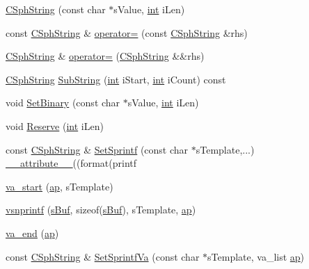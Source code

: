 \begin{DoxyCompactItemize}
\hyperlink{structCSphString_a346b8a5d60beab04f0c69f99e47a7c7a}{C\-Sph\-String} (const char $\ast$s\-Value, \hyperlink{sphinxexpr_8cpp_a4a26e8f9cb8b736e0c4cbf4d16de985e}{int} i\-Len)
\item 
const \hyperlink{structCSphString}{C\-Sph\-String} \& \hyperlink{structCSphString_a328132cd4567c90ea43520565387c33e}{operator=} (const \hyperlink{structCSphString}{C\-Sph\-String} \&rhs)
\item 
\hyperlink{structCSphString}{C\-Sph\-String} \& \hyperlink{structCSphString_a111c32ef89a83ff86975ea8a2f18a58c}{operator=} (\hyperlink{structCSphString}{C\-Sph\-String} \&\&rhs)
\item 
\hyperlink{structCSphString}{C\-Sph\-String} \hyperlink{structCSphString_ac0c416323fb821485dceee5a36a16b8d}{Sub\-String} (\hyperlink{sphinxexpr_8cpp_a4a26e8f9cb8b736e0c4cbf4d16de985e}{int} i\-Start, \hyperlink{sphinxexpr_8cpp_a4a26e8f9cb8b736e0c4cbf4d16de985e}{int} i\-Count) const 
\item 
void \hyperlink{structCSphString_a88c4eb5903c982a8d0d7a2aac914c0ae}{Set\-Binary} (const char $\ast$s\-Value, \hyperlink{sphinxexpr_8cpp_a4a26e8f9cb8b736e0c4cbf4d16de985e}{int} i\-Len)
\item 
void \hyperlink{structCSphString_a067958173bc99094ec2e37fb44ade79e}{Reserve} (\hyperlink{sphinxexpr_8cpp_a4a26e8f9cb8b736e0c4cbf4d16de985e}{int} i\-Len)
\item 
const \hyperlink{structCSphString}{C\-Sph\-String} \& \hyperlink{structCSphString_a88f9e008e7bb8015a035833581067cc6}{Set\-Sprintf} (const char $\ast$s\-Template,...) \hyperlink{sphinxstd_8h_a9d373a9b65ff25b2db84c07394e1c212}{\-\_\-\-\_\-attribute\-\_\-\-\_\-}((format(printf
\item 
\hyperlink{structCSphString_a0d012825d0ab784c3850aecd3d435b79}{va\-\_\-start} (\hyperlink{structCSphString_a4c58ce65bc91d1bbc191864b1f76b8e1}{ap}, s\-Template)
\item 
\hyperlink{structCSphString_a14e8b5b874b8bc6a64dd7da38703bc0b}{vsnprintf} (\hyperlink{structCSphString_a661025ca9389a788dad43bb9af8badd0}{s\-Buf}, sizeof(\hyperlink{structCSphString_a661025ca9389a788dad43bb9af8badd0}{s\-Buf}), s\-Template, \hyperlink{structCSphString_a4c58ce65bc91d1bbc191864b1f76b8e1}{ap})
\item 
\hyperlink{structCSphString_adac832ee9cafd96b4c0de82918384f39}{va\-\_\-end} (\hyperlink{structCSphString_a4c58ce65bc91d1bbc191864b1f76b8e1}{ap})
\item 
const \hyperlink{structCSphString}{C\-Sph\-String} \& \hyperlink{structCSphString_ab1dfec7c8259b0acce2b867d8680542f}{Set\-Sprintf\-Va} (const char $\ast$s\-Template, va\-\_\-list \hyperlink{structCSphString_a4c58ce65bc91d1bbc191864b1f76b8e1}{ap})

\end{DoxyCompactItemize}
